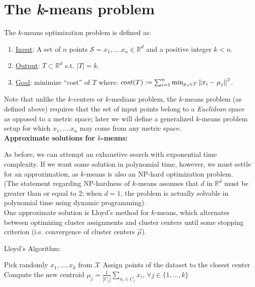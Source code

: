 \section{The \emph{k}-means problem}
The $k$-means optimization problem is defined as:
\begin{enumerate}
\item \underline{Input}: A set of $n$ points $\mathcal{S} = x_1,....x_n \in
\mathbb{R}^d$ and a positive integer $k<n$.
\item \underline{Output}: $T \subset  \mathbb{R}^d$ s.t. $|T|=k$. 
\item \underline{Goal}: minimize ``cost'' of $T$ where: $cost(T) 
:= \sum_{i = 1}^{n} \min_{\mu_j \in T} \left\lVert x_i-\mu_j\right\rVert^2 $.
\end{enumerate}

Note that unlike the $k$-centers or $k$-medians problem, the $k$-means problem (as defined above) requires that the set of input points belong to a \emph{Euclidean} space as opposed to a metric space; later we will define a generalized $k$-means problem setup for which $x_1,....x_n$ may come from any metric space. \\

\noindent\textbf{Approximate solutions for $k$-means:}  

As before, we can attempt an exhaustive search with exponential
time complexity. If we want some solution in polynomial time, however, we
must settle for an approximation, as $k$-means is also an NP-hard
optimization problem. \\

(The statement regarding NP-hardness of $k$-means assumes that $d$ in $\mathbb{R}^d$ must be greater than or equal to 2; when $d = 1$, the problem is actually solvable in polynomial time using dynamic programming).\\

One approximate solution is Lloyd's method for $k$-means, which alternates between optimizing cluster assignments and cluster centers until some stopping criterion (i.e. convergence of cluster centers $\vec{\mu}$).

\begin{algorithm}
\caption{Lloyd's Algorithm:}
\begin{algorithmic} 
\STATE Pick randomly $x_1,...,x_k $ from $\mathcal{X}$ \;
\STATE Assign points of the dataset to the closest center \;
\STATE Compute the new centroid $\mu_j = \frac{1}{|C_j|}
\sum_{x_i\in C_j} x_i$, $\forall j \in \{1,...,k\}$\;
\ENDFOR
\ENDWHILE
\end{algorithmic}
\end{algorithm}

